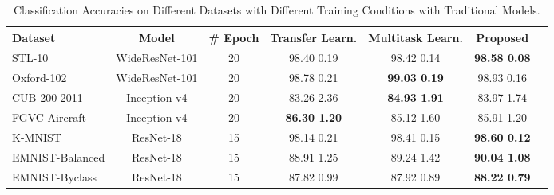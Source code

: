 \documentclass{article}
\begin{document}
\begin{table*}[t]
\caption{Classification Accuracies on Different Datasets with Different Training Conditions with Traditional Models.}
\label{Tclass}
\vskip 0.15in
\begin{center}
\begin{small}
\begin{sc}
\begin{tabular}{lcccccr}
\toprule
Dataset & Model & \# Epoch & Transfer Learn. & Multitask Learn. & Proposed \\
\midrule  
STL-10  &WideResNet-101 &20& 98.40 0.19& 98.42 0.14 & \bf{98.58 0.08} \\
Oxford-102 &WideResNet-101 &20& 98.78 0.21& \bf{99.03 0.19} & 98.93 0.16 \\
CUB-200-2011 &Inception-v4 &20& 83.26 2.36& \bf{84.93 1.91}& 83.97 1.74 \\
FGVC Aircraft &Inception-v4 &20& \bf{86.30 1.20}& 85.12 1.60& 85.91 1.20\\
K-MNIST  &ResNet-18  &15& 98.14 0.21& 98.41 0.15& \bf{98.60 0.12} \\
EMNIST-Balanced &ResNet-18 &15& 88.91 1.25& 89.24 1.42& \bf{90.04 1.08} \\
EMNIST-Byclass &ResNet-18 &15& 87.82 0.99& 87.92 0.89& \bf{88.22 0.79} \\


\bottomrule
\end{tabular}
\end{sc}
\end{small}
\end{center}
\vskip -0.1in
\end{table*}
\end{document}

